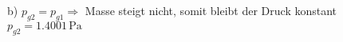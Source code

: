 b) $p_{g2} = p_{g1} \Rightarrow$ Masse steigt nicht, somit bleibt der Druck konstant $p_{g2} = 1.4001 \, \text{Pa}$